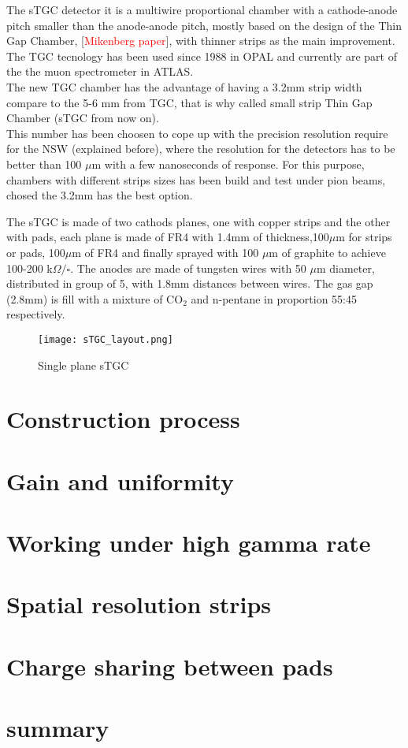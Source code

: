 	The sTGC detector it is a multiwire proportional chamber with a cathode-anode pitch smaller than the anode-anode pitch, mostly based on the design of the Thin Gap Chamber, [\textcolor{red}{Mikenberg paper}], with thinner strips as the main improvement. The TGC tecnology has been used since 1988 in OPAL and currently are part of the the muon spectrometer in ATLAS. \\
	The new TGC chamber has the advantage of having a 3.2mm strip width compare to the 5-6 mm from TGC, that is why called small strip Thin Gap Chamber (sTGC from now on).\\ 
	This number has been choosen to cope up with the precision resolution require for the NSW (explained before), where the resolution for the detectors has to be better than 100 $\mu$m with a few nanoseconds of response. For this purpose, chambers with different strips sizes has been build and test under pion beams, chosed the 3.2mm has the best option\cite{stripwidth}. \par


The sTGC is made of two cathods planes, one with copper strips and the other with pads, each plane is made of FR4 with 1.4mm of thickness,100$\mu$m for strips or pads, 100$\mu$m of FR4 and finally sprayed with 100 $\mu$m of graphite to achieve 100-200 k$\Omega / \square$. The anodes are made of tungsten wires with 50 $\mu$m diameter, distributed in group of 5, with 1.8mm distances between wires. The gas gap (2.8mm) is fill with a mixture of CO$_2$ and n-pentane in proportion 55:45 respectively.  

\begin{figure}[h]
		\centering
		\texttt{[image: sTGC\_layout.png]}
		\caption{Single plane sTGC}\label{fig:sTGC}
\end{figure}


\section{Construction process}

\section{Gain and uniformity}

\section{Working under high gamma rate}

\section{Spatial resolution strips}

\section{Charge sharing between pads}

\section{summary}
